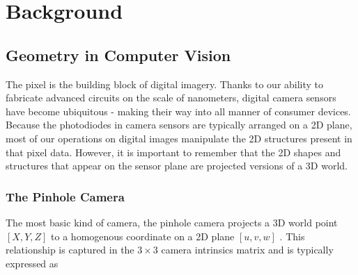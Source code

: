 
\chapter{Background}


\section{Geometry in Computer Vision}

The pixel is the building block of digital imagery. Thanks to our ability to fabricate advanced circuits on the scale of nanometers, digital camera sensors have become ubiquitous - making their way into all manner of consumer devices. Because the photodiodes in camera sensors are typically arranged on a 2D plane, most of our operations on digital images manipulate the 2D structures present in that pixel data. However, it is important to remember that the 2D shapes and structures that appear on the sensor plane are projected versions of a 3D world. 

\subsection{The Pinhole Camera}

The most basic kind of camera, the pinhole camera projects a 3D world point $[X, Y, Z]$ to a homogenous coordinate on a 2D plane $[u, v, w]$ \cite{zisserman2004multiview}. This relationship is captured in the $3 \times 3$ camera intrinsics matrix and is typically expressed as 

